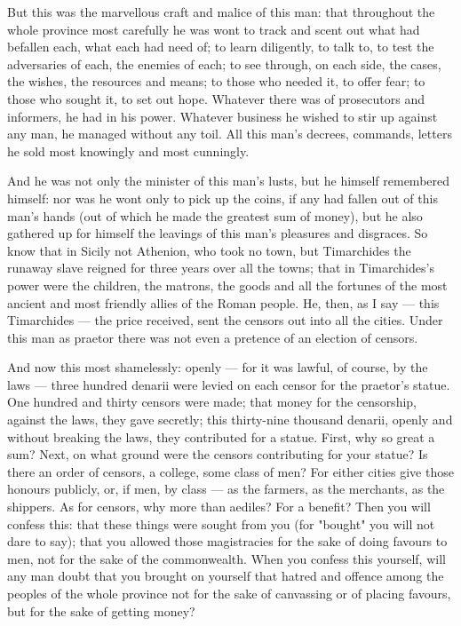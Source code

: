  But this was the marvellous craft and malice of this man: that throughout the whole province most carefully he was wont to track and scent out what had befallen each, what each had need of; to learn diligently, to talk to, to test the adversaries of each, the enemies of each; to see through, on each side, the cases, the wishes, the resources and means; to those who needed it, to offer fear; to those who sought it, to set out hope. Whatever there was of prosecutors and informers, he had in his power. Whatever business he wished to stir up against any man, he managed without any toil. All this man's decrees, commands, letters he sold most knowingly and most cunningly.

 And he was not only the minister of this man's lusts, but he himself remembered himself: nor was he wont only to pick up the coins, if any had fallen out of this man's hands (out of which he made the greatest sum of money), but he also gathered up for himself the leavings of this man's pleasures and disgraces. So know that in Sicily not Athenion, who took no town, but Timarchides the runaway slave reigned for three years over all the towns; that in Timarchides's power were the children, the matrons, the goods and all the fortunes of the most ancient and most friendly allies of the Roman people. He, then, as I say --- this Timarchides --- the price received, sent the censors out into all the cities. Under this man as praetor there was not even a pretence of an election of censors.

 And now this most shamelessly: openly --- for it was lawful, of course, by the laws --- three hundred denarii were levied on each censor for the praetor's statue. One hundred and thirty censors were made; that money for the censorship, against the laws, they gave secretly; this thirty-nine thousand denarii, openly and without breaking the laws, they contributed for a statue. First, why so great a sum? Next, on what ground were the censors contributing for your statue? Is there an order of censors, a college, some class of men? For either cities give those honours publicly, or, if men, by class --- as the farmers, as the merchants, as the shippers. As for censors, why more than aediles? For a benefit? Then you will confess this: that these things were sought from you (for "bought" you will not dare to say); that you allowed those magistracies for the sake of doing favours to men, not for the sake of the commonwealth. When you confess this yourself, will any man doubt that you brought on yourself that hatred and offence among the peoples of the whole province not for the sake of canvassing or of placing favours, but for the sake of getting money?

